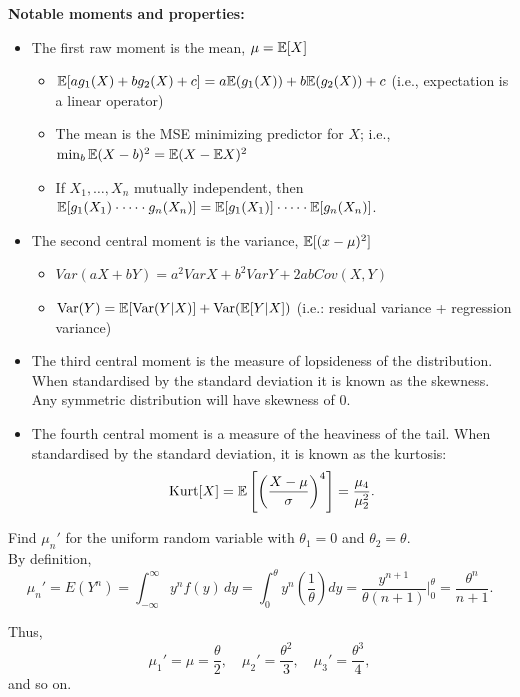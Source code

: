 \documentclass[DIV=14,titlepage=false]{scrreprt}
\begin{document}
\textbf{Notable moments and properties:}
\begin{itemize}
  \item The first raw moment is the mean, $\mu = \mathbb{E} [X]$
  \begin{itemize}
    \item $ \mathbb{E} [a g_1(X) + b g_2(X) + c] = a \mathbb{E}(g_1(X)) + b \mathbb{E}(g_2(X)) + c $ (i.e., expectation is a linear operator)
    \item The mean is the MSE minimizing predictor for $ X $; i.e., $ \min_b \mathbb{E} (X - b)^2 = \mathbb{E} (X - \mathbb{E} X)^2 $
    \item If $ X_1, \dotsc , X_n $ mutually independent, then $ \mathbb{E} [ g_1(X_1) \cdot \dotsb \cdot g_n(X_n) ] = \mathbb{E} [ g_1(X_1)] \cdot \dotsb \cdot \mathbb{E} [g_n(X_n) ] $.
  \end{itemize}
  \item The second central moment is the variance, $\mathbb{E} [(x-\mu)^2]$
  \begin{itemize}
    \item $Var(aX + bY) = a^2 VarX + b^2 VarY + 2ab Cov(X,Y) $
    \item $\text{Var}(Y) = \mathbb{E} [\text{Var}(Y|X)] + \text{Var}(\mathbb{E} [Y|X])$ (i.e.: residual variance + regression variance)

  \end{itemize}
  \item The third central moment is the measure of lopsideness of the distribution. When standardised by the standard deviation it is known as the skewness. Any symmetric distribution will have skewness of 0.
  \item The fourth central moment is a measure of the heaviness of the tail. When standardised by the standard deviation, it is known as the kurtosis:
  \[
  \text{Kurt}[X] = \mathbb{E}\left[ \left( \frac{X - \mu}{\sigma} \right)^4 \right]= \frac{\mu_4}{\mu^2_2}.
  \]
\end{itemize}

\begin{example}
  Find \( \mu_n' \) for the uniform random variable with \( \theta_1 = 0 \) and \( \theta_2 = \theta \).
\\
  By definition,
  \[
  \mu_n' = E(Y^n) = \int_{-\infty}^{\infty} y^n f(y) \, dy = \int_{0}^{\theta} y^n \left( \frac{1}{\theta} \right) dy = \frac{y^{n+1}}{\theta(n + 1)} \Bigg|_0^{\theta} = \frac{\theta^n}{n + 1}.
  \]

  Thus,
  \[
  \mu_1' = \mu = \frac{\theta}{2}, \quad \mu_2' = \frac{\theta^2}{3}, \quad \mu_3' = \frac{\theta^3}{4},
  \]
  and so on.
\end{example}
\end{document}
